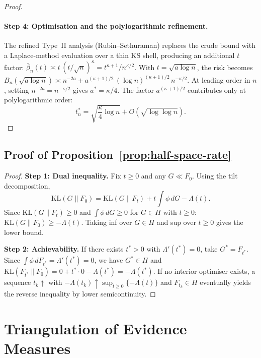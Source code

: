 \documentclass[11pt]{article}
\newcommand{\KL}{\mathrm{KL}}
\newcommand{\1}{\mathbf{1}}
\theoremstyle{plain}
\theoremstyle{definition}
\theoremstyle{remark}
\begin{document}
\begin{proof}
\paragraph{Step 4: Optimisation and the polylogarithmic refinement.}
The refined Type~II analysis (Rubin--Sethuraman) replaces the crude bound with a Laplace-method evaluation over a thin KS shell, producing an additional $t$ factor:
$\bar\beta_n(t) \asymp t\,(t/\sqrt{n})^{\kappa} = t^{\kappa+1}/n^{\kappa/2}$.
With $t=\sqrt{a\log n}$, the risk becomes
$B_n(\sqrt{a\log n}) \asymp n^{-2a} + a^{(\kappa+1)/2}\,(\log n)^{(\kappa+1)/2}\, n^{-\kappa/2}$.
At leading order in $n$, setting $n^{-2a} = n^{-\kappa/2}$ gives $a^{*} = \kappa/4$.
The factor $a^{(\kappa+1)/2}$ contributes only at polylogarithmic order:
\begin{equation}\label{eq:t-star}
t_n^* = \sqrt{\frac{\kappa}{4}\log n} + O(\sqrt{\log\log n}).
\end{equation}
\end{proof}


\subsection{Proof of Proposition~\ref{prop:half-space-rate}}\label{app:proof-halfspace}

\begin{proof}
\noindent\textbf{Step 1: Dual inequality.}
Fix $t\ge 0$ and any $G\ll F_0$. Using the tilt decomposition,
\[
\KL(G\|F_0) = \KL(G\|F_t) + t\int \phi\,dG - \Lambda(t).
\]
Since $\KL(G\|F_t)\ge 0$ and $\int \phi\,dG\ge 0$ for $G\in H$ with $t\ge 0$:
$\KL(G\|F_0) \ge -\Lambda(t)$.
Taking inf over $G\in H$ and sup over $t\ge 0$ gives the lower bound.

\noindent\textbf{Step 2: Achievability.}
If there exists $t^*>0$ with $\Lambda'(t^*)=0$, take $G^*=F_{t^*}$.
Since $\int \phi\,dF_{t^*}=\Lambda'(t^*)=0$, we have $G^*\in H$ and
$\KL(F_{t^*}\|F_0) = 0 + t^*\cdot 0 - \Lambda(t^*) = -\Lambda(t^*)$.
If no interior optimiser exists, a sequence $t_k\uparrow$ with $-\Lambda(t_k)\uparrow \sup_{t\ge 0}\{-\Lambda(t)\}$ and $F_{t_k}\in H$ eventually yields the reverse inequality by lower semicontinuity.
\end{proof}



\section{Triangulation of Evidence Measures}
\label{app:triangulation}
\end{document}
